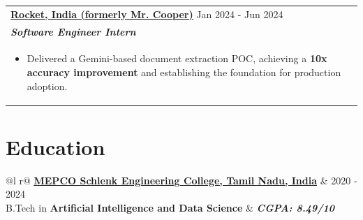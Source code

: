 \documentclass[a4paper,10pt]{article}
\begin{document}
    \vspace{-12pt}
    \begin{tabularx}{\linewidth}{ @{}l r@{} }
        \color[HTML]{1C033C} 
        \href{https://www.linkedin.com/company/mrcoopermortgage}
        {\underline{\textbf{Rocket, India (formerly Mr. Cooper)}}} \hfill \color[HTML]{371e77} Jan 2024 - Jun 2024 \\[4pt]
        \color[HTML]{371e77}\textbf{\textit{Software Engineer Intern}} \hfill \\[2pt]
        \begin{minipage}[t]{\linewidth}
            \begin{itemize}[nosep,after=\strut, leftmargin=2em, itemsep=2pt]
                \item Delivered a Gemini-based document extraction POC, achieving a \textbf{10x accuracy improvement} and establishing the foundation for production adoption.
            \end{itemize}
        \end{minipage}
    \end{tabularx}
    
    \vspace{6pt}
    \section{Education}
    \vspace{3pt}
    \begin{tabularx}{\linewidth}{ @{}l r@{} }
    \color[HTML]{1C033C} \href{https://www.mepcoeng.ac.in/}{\underline{\textbf{MEPCO Schlenk Engineering College, Tamil Nadu, India}}} & \hfill \color[HTML]{371e77} 2020 - 2024 
    \\[3pt]
    \color[HTML]{371e77} B.Tech in \textbf{Artificial Intelligence and Data Science} & \hfill \color[HTML]{4B28A4} \textit{\textbf{CGPA: 8.49/10}} \\
    \end{tabularx}
    
\end{document}
